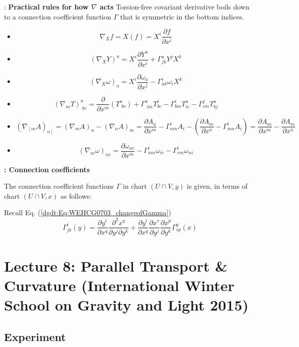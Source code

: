 	: \textbf{Practical rules for how $\nabla$ acts}
	Torsion-free covariant derivative boils down to a connection coefficient function $\Gamma$ that is symmetric in the bottom indices.
	
	\begin{itemize}
		\item \[
		\nabla_Xf = X(f) = X^i \frac{ \partial f}{ \partial x^i }
		\]
		\item \[
		(\nabla_X Y)^a = X^i \frac{ \partial Y^a}{ \partial x^i} + \Gamma^a_{jk} Y^j X^k 
		\]
		\item \[
		(\nabla_X \omega)_a = X^i \frac{ \partial \omega_a}{ \partial x^j}  - \Gamma^i_{ak} \omega_i X^k
		\]
		\item \[
		(\nabla_m T)^a_{ \, \, bc} = \frac{ \partial }{ \partial x^m} (T^a_{ \, \, bc} ) + \Gamma^a_{ \, \, im} T^i_{bc} - \Gamma^i_{bm} T^a_{ic} - \Gamma^j_{cm} T^a_{bj}
		\]
		\item \[
		(\nabla_{ \left[ m \right. } A)_{ \left. n \right] } = (\nabla_m A)_n - (\nabla_n A)_m = \frac{ \partial A_n}{ \partial x^m } - \Gamma^i_{ nm} A_i - \left( \frac{ \partial A_m}{ \partial x^n} - \Gamma^i_{mn} A_i \right) = \frac{ \partial A_m}{ \partial x^m} - \frac{ \partial A_m}{ \partial x^n }
		\]
		\item \[
		(\nabla_m \omega)_{nr} = \frac{ \partial \omega_{nr}}{ \partial x^m} - \Gamma^i_{nm } \omega_{ir} - \Gamma^i_{rm} \omega_{ni}
		\]
	\end{itemize}
	
	
	\textbf{: Connection coefficients}
	
	\questionhead{}
	
	The connection coefficient functions $\Gamma$ in chart $(U \cap V,y)$ is given, in terms of chart $(U\cap V,x)$ as follows:
	
	Recall Eq. (\ref{dgdt:Eq:WEHCG0703_changeofGamma})
	\[
	\Gamma^i_{jk}(y) = \frac{ \partial y^i}{ \partial x^q} \frac{ \partial^2 x^q}{ \partial y^j \partial y^k} + \frac{ \partial y^i}{ \partial x^q } \frac{ \partial x^s }{ \partial y^j} \frac{ \partial x^p }{ \partial y^k} \Gamma^q_{sp}(x)
	\]
	
	
	
	\section*{Lecture 8: Parallel Transport \& Curvature (International Winter School on Gravity and Light 2015)}
	
\subsection*{Experiment}

